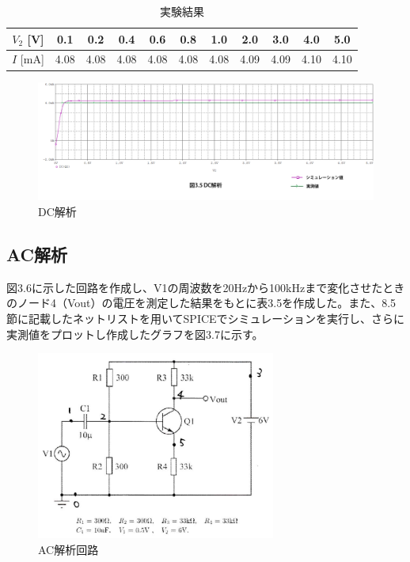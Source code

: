 \documentclass{jlreq}
\numberwithin{equation}{section}
\begin{document}
\begin{table}[H]
  \centering
    \caption{実験結果}
    \begin{tabular}{|c|c|c|c|c|c|c|c|c|c|c|}
      \hline
      \( V_{2} \) [V] & 0.1 & 0.2 & 0.4 & 0.6 & 0.8 & 1.0 & 2.0 & 3.0 & 4.0 & 5.0 \\ \hline
      \( I \) [mA] & 4.08 & 4.08 & 4.08 & 4.08 & 4.08 & 4.08 & 4.09 & 4.09 & 4.10 & 4.10 \\ \hline
    \end{tabular}
\end{table}

\begin{figure}[H]
  \centering
  \includegraphics[width=\textwidth]{assets/dckaisekiplot.png}
  \caption{DC解析}
\end{figure}

\subsection{AC解析}
図3.6に示した回路を作成し、V1の周波数を20Hzから100kHzまで変化させたときのノード4（Vout）の電圧を測定した結果をもとに表3.5を作成した。また、8.5節に記載したネットリストを用いてSPICEでシミュレーションを実行し、さらに実測値をプロットし作成したグラフを図3.7に示す。

\begin{figure}[H]
  \centering
  \includegraphics[width=0.7\textwidth]{assets/ackaisekikairo.png}
  \caption{AC解析回路}
\end{figure}
\end{document}
